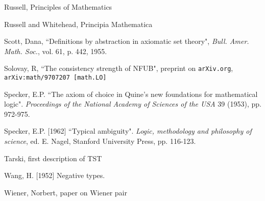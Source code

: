 \documentclass[112pt]{article}
\begin{document}
\begin{thebibliography}{99}
  Russell, Principles of Mathematics

  Russell and Whitehead, Principia Mathematica

  Scott, Dana, ``Definitions by abstraction in axiomatic set theory",  {\em Bull. Amer. Math.
Soc.}, vol. 61, p. 442, 1955.

  Solovay, R, ``The consistency strength of NFUB",  preprint on {\tt arXiv.org}, {\tt arXiv:math/9707207 [math.LO]}

  Specker, E.P.
``The axiom of choice in Quine's new foundations for mathematical logic". 
{\em Proceedings of the National Academy of Sciences of the USA\/} 39 (1953), pp. 972-975.

  Specker, E.P. [1962] 
``Typical ambiguity". 
{\em Logic, methodology and philosophy of science\/}, ed. E. Nagel, Stanford University Press, pp. 116-123.

  Tarski, first description of TST

  Wang, H. [1952] 
Negative types.

  Wiener, Norbert, paper on Wiener pair


\end{thebibliography}
\end{document}
